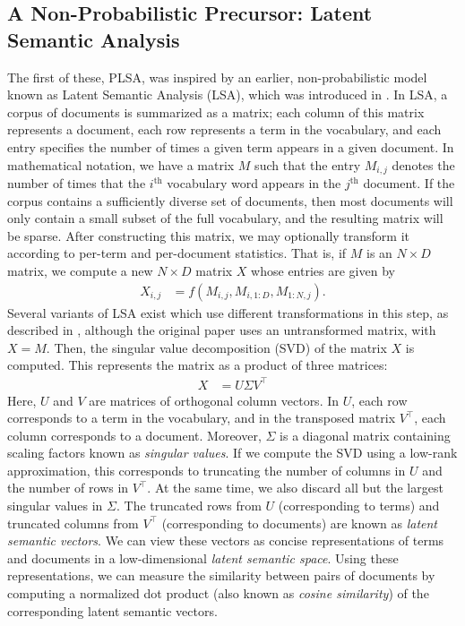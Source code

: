 \documentclass{article}
\newcommand{\nth}{^{\text{th}}}
\begin{document}
\subsection{A Non-Probabilistic Precursor: Latent Semantic Analysis}

The first of these, PLSA, was inspired by an earlier, non-probabilistic model known as Latent Semantic Analysis (LSA), which was introduced in \cite{deerwester1990lsa}.
In LSA, a corpus of documents is summarized as a matrix; each column of this matrix represents a document, each row represents a term in the vocabulary, and each entry specifies the number of times a given term appears in a given document.
In mathematical notation, we have a matrix $M$ such that the entry $M_{i,j}$ denotes the number of times that the $i\nth$ vocabulary word appears in the $j\nth$ document.
If the corpus contains a sufficiently diverse set of documents, then most documents will only contain a small subset of the full vocabulary, and the resulting matrix will be sparse.
After constructing this matrix, we may optionally transform it according to per-term and per-document statistics.
That is, if $M$ is an $N \times D$ matrix, we compute a new $N \times D$ matrix $X$ whose entries are given by
\begin{align}
X_{i,j} &= f(M_{i,j}, M_{i,1:D}, M_{1:N,j}).
\end{align}
Several variants of LSA exist which use different transformations in this step, as described in \cite{wiki:lsa}, although the original paper \cite{deerwester1990lsa} uses an untransformed matrix, with $X = M$.
Then, the singular value decomposition (SVD) of the matrix $X$ is computed.
This represents the matrix as a product of three matrices:
\begin{align}
X &= U \Sigma V^\top
\end{align}
Here, $U$ and $V$ are matrices of orthogonal column vectors.
In $U$, each row corresponds to a term in the vocabulary, and in the transposed matrix $V^\top$, each column corresponds to a document.
Moreover, $\Sigma$ is a diagonal matrix containing scaling factors known as \emph{singular values}.
If we compute the SVD using a low-rank approximation, this corresponds to truncating the number of columns in $U$ and the number of rows in $V^\top$.
At the same time, we also discard all but the largest singular values in $\Sigma$.
The truncated rows from $U$ (corresponding to terms) and truncated columns from $V^\top$ (corresponding to documents) are known as \emph{latent semantic vectors}.
We can view these vectors as concise representations of terms and documents in a low-dimensional \emph{latent semantic space}.
Using these representations, we can measure the similarity between pairs of documents by computing a normalized dot product (also known as \emph{cosine similarity}) of the corresponding latent semantic vectors.
\end{document}

